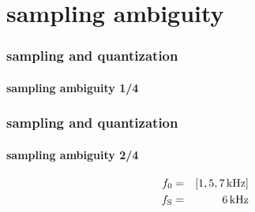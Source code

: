 	\section{sampling ambiguity}	
		\begin{frame}\frametitle{sampling and quantization}\framesubtitle{sampling ambiguity 1/4}
			\begin{center}
			\end{center}
		\end{frame}
		
		\begin{frame}\frametitle{sampling and quantization}\framesubtitle{sampling ambiguity 2/4}
			\begin{eqnarray*}
				f_0 &=& [\unit[1, 5, 7]{kHz}]\\
				f_{\mathrm{S}} &=& \unit[6]{kHz}
			\end{eqnarray*}
		\end{frame}	
		
